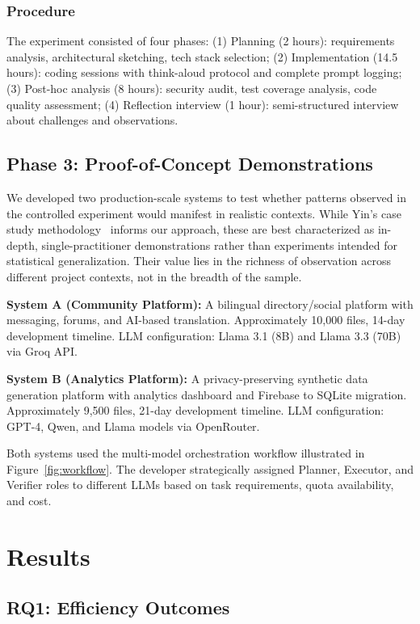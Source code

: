 \documentclass[sigconf]{acmart}
\begin{document}
\subsubsection{Procedure}

The experiment consisted of four phases: (1) Planning (2 hours): requirements analysis, architectural sketching, tech stack selection; (2) Implementation (14.5 hours): coding sessions with think-aloud protocol and complete prompt logging; (3) Post-hoc analysis (8 hours): security audit, test coverage analysis, code quality assessment; (4) Reflection interview (1 hour): semi-structured interview about challenges and observations.

\subsection{Phase 3: Proof-of-Concept Demonstrations}

We developed two production-scale systems to test whether patterns observed in the controlled experiment would manifest in realistic contexts. While Yin's case study methodology~\cite{yin2017case} informs our approach, these are best characterized as in-depth, single-practitioner demonstrations rather than experiments intended for statistical generalization. Their value lies in the richness of observation across different project contexts, not in the breadth of the sample.

\textbf{System A (Community Platform):} A bilingual directory/social platform with messaging, forums, and AI-based translation. Approximately 10,000 files, 14-day development timeline. LLM configuration: Llama 3.1 (8B) and Llama 3.3 (70B) via Groq API.

\textbf{System B (Analytics Platform):} A privacy-preserving synthetic data generation platform with analytics dashboard and Firebase to SQLite migration. Approximately 9,500 files, 21-day development timeline. LLM configuration: GPT-4, Qwen, and Llama models via OpenRouter.

Both systems used the multi-model orchestration workflow illustrated in Figure~\ref{fig:workflow}. The developer strategically assigned Planner, Executor, and Verifier roles to different LLMs based on task requirements, quota availability, and cost.

\section{Results}

\subsection{RQ1: Efficiency Outcomes}
\end{document}
